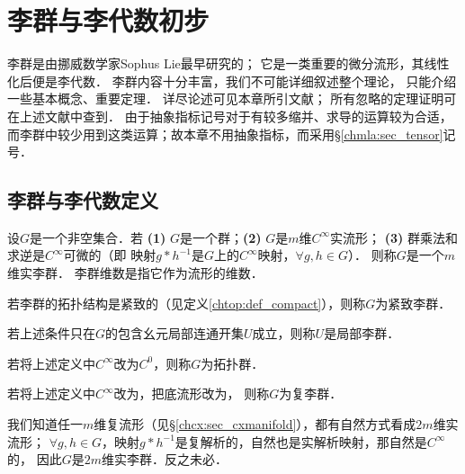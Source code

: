
\chapter{李群与李代数初步}\label{chlg}

李群是由挪威数学家Sophus Lie最早研究的；
它是一类重要的微分流形，其线性化后便是李代数．
李群内容十分丰富，我们不可能详细叙述整个理论，
只能介绍一些基本概念、重要定理．
详尽论述可见本章所引文献；
所有忽略的定理证明可在上述文献中查到．
由于抽象指标记号对于有较多缩并、求导的运算较为合适，
而李群中较少用到这类运算；故本章不用抽象指标，而采用\S \ref{chmla:sec_tensor}记号．


\section{李群与李代数定义}\label{chlg:sec_definition}

\begin{definition}\label{chlg:def_lg}
    设$G$是一个非空集合．若
    {\bfseries (1)} $G$是一个群；{\bfseries (2)} $G$是$m$维$C^\infty$实流形；
    {\bfseries (3)} 群乘法和求逆是$C^\infty$可微的（即
    映射$g* h^{-1}$是$G$上的$C^\infty$映射，$\forall g,h\in G$）．
    则称$G$是一个$m$维{\heiti 实李群}．
    李群{\heiti 维数}是指它作为流形的维数．

    若李群的拓扑结构是紧致的（见定义\ref{chtop:def_compact}），则称$G$为{\heiti 紧致李群}．
    
    若上述条件只在$G$的包含幺元局部连通开集$U$成立，则称$U$是{\heiti 局部李群}．
       
    若将上述定义中$C^\infty$改为$C^0$，则称$G$为{\heiti 拓扑群}．
    
    若将上述定义中$C^\infty$改为，把底流形改为，
    则称$G$为{\heiti 复李群}．
\end{definition}

我们知道任一$m$维复流形（见\S\ref{chcx:sec_cxmanifold}），都有自然方式看成$2m$维实流形；
$\forall g,h\in G$，映射$g* h^{-1}$是复解析的，自然也是实解析映射，那自然是$C^\infty$的，
因此$G$是$2m$维实李群．反之未必．


